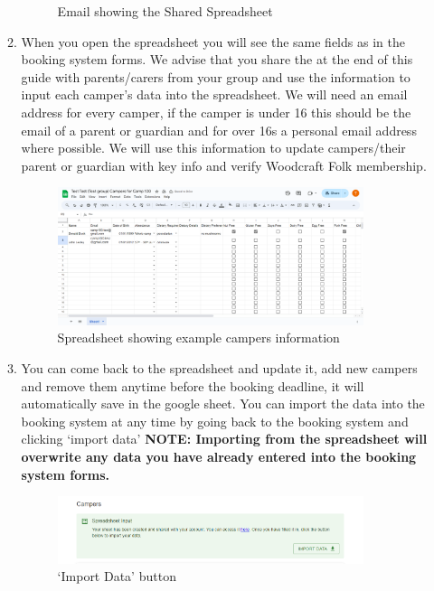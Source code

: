\documentclass[a4paper, 11pt]{report}
\begin{document}
\begin{enumerate}
\begin{enumerate}
\begin{figure}[H]
            \caption{Email showing the Shared Spreadsheet}
        \end{figure}
        \item When you open the spreadsheet you will see the same fields as in the booking system forms. We advise that you share the  at the end of this guide with parents/carers from your group and use the information to input each camper's data into the spreadsheet. We will need an email address for every camper, if the camper is under 16 this should be the email of a parent or guardian and for over 16s a personal email address where possible. We will use this information to update campers/their parent or guardian with key info and verify Woodcraft Folk membership.
        \begin{figure}[H]
            \centering
            \includegraphics[width=0.9\textwidth]{assets/2-spreadsheet.png}
            \caption{Spreadsheet showing example campers information}
        \end{figure}
        \item You can come back to the spreadsheet and update it, add new campers and remove them anytime before the booking deadline, it will automatically save in the google sheet. You can import the data into the booking system at any time by going back to the booking system and clicking `import data' \textbf{NOTE: Importing from the spreadsheet will overwrite any data you have already entered into the booking system forms.}
        \begin{figure}[H]
            \centering
            \includegraphics[width=0.9\textwidth]{assets/2-spreadsheet-import.png}
            \caption{`Import Data' button}

\end{figure}
\end{enumerate}
\end{enumerate}
\end{document}

